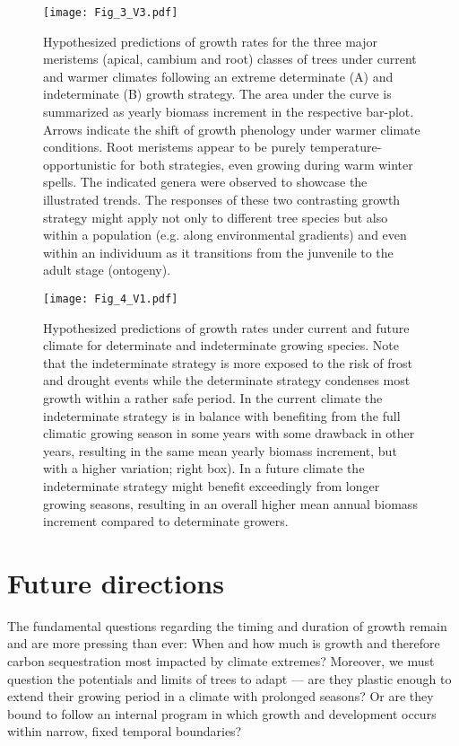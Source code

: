 \documentclass{article}
\begin{document}
								\begin{figure}
								\centering
								\texttt{[image: Fig\_3\_V3.pdf]} 
								\caption{Hypothesized predictions of growth rates for the three major meristems (apical, cambium and root) classes of trees under current and warmer climates following an extreme determinate (A) and indeterminate (B) growth strategy. The area under the curve is summarized as yearly biomass increment in the respective bar-plot. Arrows indicate the shift of growth phenology under warmer climate conditions. Root meristems appear to be purely temperature-opportunistic for both strategies, even growing during warm winter spells. The indicated genera were observed to showcase the illustrated trends. The responses of these two contrasting growth strategy might apply not only to different tree species but also within a population (e.g. along environmental gradients) and even within an individuum as it transitions from the junvenile to the adult stage (ontogeny).}
								\label{fig:fig_3xxx}
							\end{figure}
	
								\begin{figure}
								\centering
								\texttt{[image: Fig\_4\_V1.pdf]} 
								\caption{Hypothesized predictions of growth rates under current and future climate for determinate and indeterminate growing species. Note that the indeterminate strategy is more exposed to the risk of frost and drought events while the determinate strategy condenses most growth within a rather safe period. In the current climate the indeterminate strategy is in balance with benefiting from the full climatic growing season in some years with some drawback in other years, resulting in the same mean yearly biomass increment, but with a higher variation; right box). In a future climate the indeterminate strategy might benefit exceedingly from longer growing seasons, resulting in an overall higher mean annual biomass increment compared to determinate growers.}
								\label{fig:fig_4xxx}
							\end{figure}
	\pagebreak
\section*{Future directions}
The fundamental questions regarding the timing and duration of growth remain and are more pressing than ever: When and how much is growth and therefore carbon sequestration most impacted by climate extremes? Moreover, we must question the potentials and limits of trees to adapt --- are they plastic enough to extend their growing period in a climate with prolonged seasons? Or are they bound to follow an internal program in which growth and development occurs within narrow, fixed temporal boundaries? 
\end{document}
